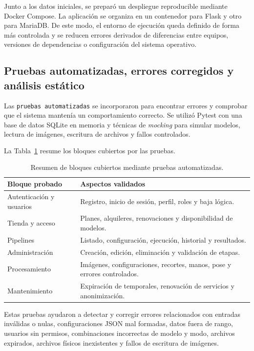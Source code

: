 Junto a los datos iniciales, se preparó un despliegue reproducible mediante Docker Compose. La aplicación se organiza en un contenedor para Flask y otro para MariaDB. De este modo, el entorno de ejecución queda definido de forma más controlada y se reducen errores derivados de diferencias entre equipos, versiones de dependencias o configuración del sistema operativo.

\subsection{Pruebas automatizadas, errores corregidos y análisis estático}

Las \texttt{pruebas automatizadas} se incorporaron para encontrar errores y comprobar que el sistema mantenía un comportamiento correcto. Se utilizó Pytest con una base de datos SQLite en memoria y técnicas de \textit{mocking} para simular modelos, lectura de imágenes, escritura de archivos y fallos controlados.

La Tabla~\ref{tabla:pruebas-automatizadas} resume los bloques cubiertos por las pruebas.

\begin{table}[htbp]
	\centering
	\small
	\begin{tabular}{p{} p{}}
		\toprule
		\textbf{Bloque probado} & \textbf{Aspectos validados} \\
		\midrule
		Autenticación y usuarios & Registro, inicio de sesión, perfil, roles y baja lógica. \\
		\midrule
		Tienda y acceso & Planes, alquileres, renovaciones y disponibilidad de modelos. \\
		\midrule
		Pipelines & Listado, configuración, ejecución, historial y resultados. \\
		\midrule
		Administración & Creación, edición, eliminación y validación de etapas. \\
		\midrule
		Procesamiento & Imágenes, configuraciones, recortes, manos, pose y errores controlados. \\
		\midrule
		Mantenimiento & Expiración de temporales, renovación de servicios y anonimización. \\
		\bottomrule
	\end{tabular}
	\caption[Resumen de pruebas automatizadas.]{Resumen de bloques cubiertos mediante pruebas automatizadas.}
	\label{tabla:pruebas-automatizadas}
\end{table}

Estas pruebas ayudaron a detectar y corregir errores relacionados con entradas inválidas o nulas, configuraciones JSON mal formadas, datos fuera de rango, usuarios sin permisos, combinaciones incorrectas de modelo y modo, archivos expirados, archivos físicos inexistentes y fallos de escritura de imágenes.

